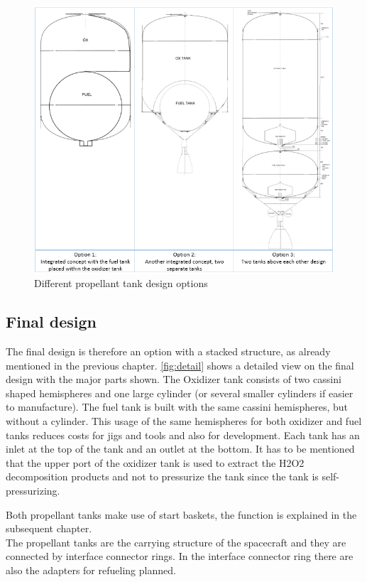 \begin{figure}[H]
	\centering
	\includegraphics[width=\linewidth]{tankdesignoption}
	\caption{Different propellant tank design options}\label{fig:tankdesign}
\end{figure}
\subsection{Final design}
The final design is therefore an option with a stacked structure, as already mentioned in the previous chapter. \autoref{fig:detail} shows a detailed view on the final design with the major parts shown. The Oxidizer tank consists of two cassini shaped hemispheres and one large cylinder (or several smaller cylinders if easier to manufacture). The fuel tank is built with the same cassini hemispheres, but without a cylinder. This usage of the same hemispheres for both oxidizer and fuel tanks reduces costs for jigs and tools and also for development. Each tank has an inlet at the top of the tank and an outlet at the bottom. It has to be mentioned that the upper port of the oxidizer tank is used to extract the H2O2 decomposition products and not to pressurize the tank since the tank is self-pressurizing.

Both propellant tanks make use of start baskets, the function is explained in the subsequent chapter.\\

The propellant tanks are the carrying structure of the spacecraft and they are connected by interface connector rings. In the interface connector ring there are also the adapters for refueling planned.\\

